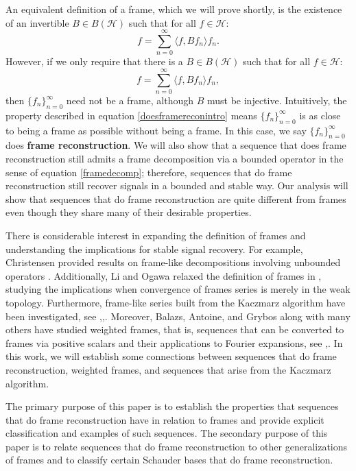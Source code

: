 \documentclass[11pt]{amsart}
\theoremstyle{definition}
\numberwithin{equation}{section}
\newcommand{\Hcal}{\mathcal{H}} %
\begin{document}
An equivalent definition of a frame, which we will prove shortly, is the existence of an invertible $B\in B(\Hcal)$ such that
for all $f\in \Hcal$:
$$f=\sum_{n=0}^{\infty} \langle f, Bf_n\rangle f_n.$$ However, if we only require that there is a $B\in B(\Hcal)$ such that
for all $f\in \Hcal$:
\begin{equation}\label{doesframereconintro}
f=\sum_{n=0}^{\infty} \langle f, Bf_n\rangle f_n,\end{equation} then $\{f_n\}_{n=0}^{\infty}$ need not be a frame, although $B$ must be injective. Intuitively, the property described in equation \eqref{doesframereconintro} means $\{f_n\}_{n=0}^{\infty}$ is as close to being a frame as possible without being a frame. In this case, we say $\{f_n\}_{n=0}^{\infty}$ does \textbf{frame reconstruction}. We will also show that a sequence that does frame reconstruction still admits a frame decomposition via a bounded operator in the sense of equation \eqref{framedecomp}; therefore, sequences that do frame reconstruction still recover signals in a bounded and stable way. Our analysis will show that sequences that do frame reconstruction are quite different from frames even though they share many of their desirable properties.

There is considerable interest in expanding the definition of frames and understanding the implications for stable signal recovery. For example, Christensen provided results on frame-like decompositions involving unbounded operators \cite{Christensen1995Frames}. Additionally, Li and Ogawa relaxed the definition of frames in \cite{Li2001Pseudo-duals}, studying the implications when convergence of frames series is merely in the weak topology. Furthermore, frame-like series built from the Kaczmarz algorithm have been investigated, see \cite{Haller2005Kaczmarz},\cite{Herr2017Fourier},\cite{Kwapien2001Kaczmarz}. Moreover, Balazs, Antoine, and Grybos along with many others have studied weighted frames, that is, sequences that can be converted to frames via positive scalars and their applications to Fourier expansions, see \cite{Balazs2010Weighted},\cite{Dutkay2016Weighted}. In this work, we will establish some connections between sequences that do frame reconstruction, weighted frames, and sequences that arise from the Kaczmarz algorithm. 

The primary purpose of this paper is to establish the properties that sequences that do frame reconstruction have in relation to frames and provide explicit classification and examples of such sequences. The secondary purpose of this paper is to relate sequences that do frame reconstruction to other generalizations of frames and to classify certain Schauder bases that do frame reconstruction.
\end{document}
